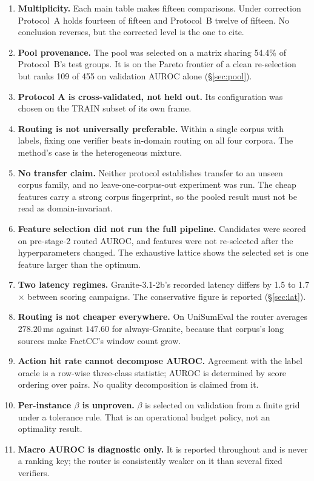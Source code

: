 \documentclass[10pt,a4paper]{article}
\begin{document}
\begin{enumerate}[label=\textbf{\arabic*.}]
\item \textbf{Multiplicity.} Each main table makes fifteen comparisons. Under correction
Protocol~A holds fourteen of fifteen and Protocol~B twelve of fifteen. No conclusion reverses,
but the corrected level is the one to cite.
\item \textbf{Pool provenance.} The pool was selected on a matrix sharing 54.4\% of Protocol~B's
test groups. It is on the Pareto frontier of a clean re-selection but ranks 109 of 455 on
validation AUROC alone (\S\ref{sec:pool}).
\item \textbf{Protocol A is cross-validated, not held out.} Its configuration was chosen on the
TRAIN subset of its own frame.
\item \textbf{Routing is not universally preferable.} Within a single corpus with labels, fixing
one verifier beats in-domain routing on all four corpora. The method's case is the heterogeneous
mixture.
\item \textbf{No transfer claim.} Neither protocol establishes transfer to an unseen corpus
family, and no leave-one-corpus-out experiment was run. The cheap features carry a strong corpus
fingerprint, so the pooled result must not be read as domain-invariant.
\item \textbf{Feature selection did not run the full pipeline.} Candidates were scored on
pre-stage-2 routed AUROC, and features were not re-selected after the hyperparameters changed.
The exhaustive lattice shows the selected set is one feature larger than the optimum.
\item \textbf{Two latency regimes.} Granite-3.1-2b's recorded latency differs by 1.5 to
1.7$\times$ between scoring campaigns. The conservative figure is reported (\S\ref{sec:lat}).
\item \textbf{Routing is not cheaper everywhere.} On UniSumEval the router averages $278.20$\,ms
against $147.60$ for always-Granite, because that corpus's long sources make FactCC's window
count grow.
\item \textbf{Action hit rate cannot decompose AUROC.} Agreement with the label oracle is a
row-wise three-class statistic; AUROC is determined by score ordering over pairs. No quality
decomposition is claimed from it.
\item \textbf{Per-instance $\beta$ is unproven.} $\beta$ is selected on validation from a finite
grid under a tolerance rule. That is an operational budget policy, not an optimality result.
\item \textbf{Macro AUROC is diagnostic only.} It is reported throughout and is never a ranking
key; the router is consistently weaker on it than several fixed verifiers.
\end{enumerate}
\end{document}
